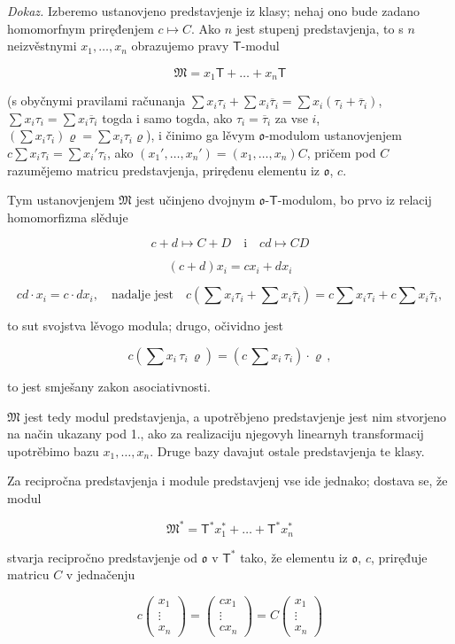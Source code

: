 \documentclass[11pt]{article}
\begin{document}
\emph{Dokaz.} Izberemo ustanovjeno predstavjenje iz klasy; nehaj ono bude zadano homomorfnym priręđenjem \(c\mapsto C\). Ako \(n\) jest stupenj predstavjenja, to s \(n\) neizvěstnymi \(x_1,\ldots,x_n\) obrazujemo pravy \(\mathsf T\)-modul

\[\mathfrak{M} = x_1 \mathsf{T} + \dots + x_n \mathsf{T}\]

(s obyčnymi pravilami računanja \(\sum x_i\tau_i+\sum x_i\overline{\tau}_i=\sum x_i(\tau_i+\overline{\tau}_i)\), \(\sum x_i\tau_i=\sum x_i\overline{\tau}_i\) togda i samo togda, ako \(\tau_i=\overline{\tau}_i\) za vse \(i\), \((\sum x_i\tau_i)\varrho=\sum x_i\tau_i\varrho\)), i činimo ga lěvym \(\mathfrak{o}\)-modulom ustanovjenjem \(c\sum x_i\tau_i=\sum x_i'\tau_i\), ako \((x_1',\ldots,x_n')=(x_1,\ldots,x_n)C\), pričem pod \(C\) razumějemo matricu predstavjenja, priręđenu elementu iz \(\mathfrak{o}\), \(c\).

Tym ustanovjenjem \(\mathfrak M\) jest učinjeno dvojnym \(\mathfrak{o}\)-\(\mathsf T\)-modulom, bo prvo iz relacij homomorfizma slěduje

\[
c+d\mapsto C+D \quad \text{i} \quad cd\mapsto CD
\]

\[
(c+d)x_i=cx_i+dx_i
\]

\[
cd\cdot x_i=c\cdot dx_i,\quad\text{nadalje jest}\quad
c\left(\sum x_i\tau_i+\sum x_i\overline{\tau}_i\right)
=c\sum x_i\tau_i+c\sum x_i\overline{\tau}_i,
\]

to sut svojstva lěvogo modula; drugo, očividno jest

\[c(\sum x_i \, \tau_i \, \varrho) = (c \, \sum x_i \, \tau_i) \cdot \varrho \,,\]

to jest smješany zakon asociativnosti.

\(\mathfrak{M}\) jest tedy modul predstavjenja, a upotrěbjeno predstavjenje jest nim stvorjeno na način ukazany pod 1., ako za realizaciju njegovyh linearnyh transformacij upotrěbimo bazu \(x_1, \ldots, x_n\). Druge bazy davajut ostale predstavjenja te klasy.

Za recipročna predstavjenja i module predstavjenj vse ide jednako; dostava se, že modul

\[\mathfrak{M}^* = \mathsf{T}^* x_1^* + \dots + \mathsf{T}^* x_n^*\]

stvarja recipročno predstavjenje od \(\mathfrak{o}\) v \(\mathsf T^*\) tako, že elementu iz \(\mathfrak{o}\), \(c\), priręđuje matricu \(C\) v jednačenju

\[
c\begin{pmatrix}x_1\\ \vdots\\ x_n\end{pmatrix}
=\begin{pmatrix}cx_1\\ \vdots\\ cx_n\end{pmatrix}
=C\begin{pmatrix}x_1\\ \vdots\\ x_n\end{pmatrix}
\]
\end{document}
